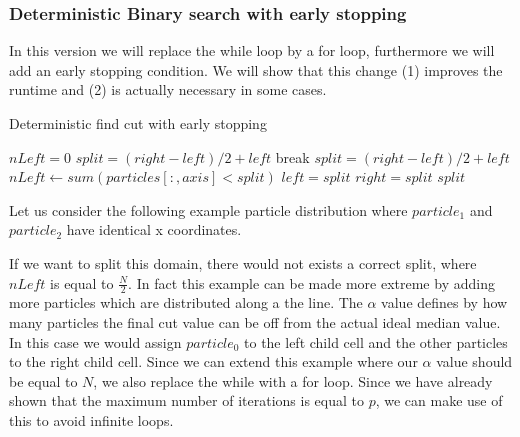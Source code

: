 \documentclass[]{article}
\begin{document}
\subsubsection{Deterministic Binary search with early stopping }

In this version we will replace the while loop by a for loop, furthermore we will add an early stopping condition. We will show that this change (1) improves the runtime and (2) is actually necessary in some cases.

\begin{algorithm}[H]
	\caption{Deterministic find cut with early stopping}\label{algo:cut}
	\begin{algorithmic}[1]
		\State $nLeft = 0$
		\State $split = (right - left) / 2 + left $ 
		\State break
		\EndIf
		\State $split = (right - left) / 2 + left $
		\State $nLeft\gets sum(particles[:,axis] < split)$
		\State $left = split$
		\Else 
		\State $right = split$
		\EndIf
		\EndFor
		\State \Return $split$
		\EndProcedure
	\end{algorithmic}
\end{algorithm}

Let us consider the following example particle distribution where $particle_1$ and $particle_2$ have identical x coordinates. 

\begin{figure}[H]
	\begin{center}
	\end{center}
\end{figure}

If we want to split this domain, there would not exists a correct split, where $nLeft$ is equal to $\frac{N}{2}$. In fact this example can be made more extreme by adding more particles which are distributed along a the line.
The $\alpha$ value defines by how many particles the final cut value can be off from the actual ideal median value. In this case we would assign $particle_0$ to the left child cell and the other particles to the right child cell. Since we can extend this example where our $\alpha$ value should be equal to $N$, we also replace the while with a for loop. Since we have already shown that the maximum number of iterations is equal to $p$, we can make use of this to avoid infinite loops. 
\end{document}
